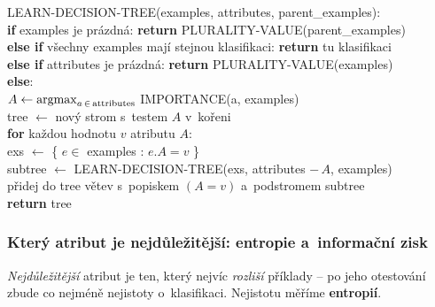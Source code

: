 \begin{algo}
\ttfamily\small
LEARN-DECISION-TREE(examples, attributes, parent\_examples):\\
\hspace*{1.5em}\textbf{if} examples je prázdná: \textbf{return} PLURALITY-VALUE(parent\_examples) \\
\hspace*{1.5em}\textbf{else if} všechny examples mají stejnou klasifikaci: \textbf{return} tu klasifikaci\\
\hspace*{1.5em}\textbf{else if} attributes je prázdná: \textbf{return} PLURALITY-VALUE(examples)\\
\hspace*{1.5em}\textbf{else}:\\
\hspace*{3em}$A \leftarrow \operatorname*{argmax}_{a\,\in\,\text{attributes}}$ IMPORTANCE(a, examples) \\
\hspace*{3em}tree $\leftarrow$ nový strom s~testem $A$ v~kořeni\\
\hspace*{3em}\textbf{for} každou hodnotu $v$ atributu $A$:\\
\hspace*{4.5em}exs $\leftarrow$ \{ $e \in$ examples : $e.A = v$ \}\\
\hspace*{4.5em}subtree $\leftarrow$ LEARN-DECISION-TREE(exs, attributes $-\,A$, examples)\\
\hspace*{4.5em}přidej do tree větev s~popiskem $(A=v)$ a~podstromem subtree\\
\hspace*{3em}\textbf{return} tree
\end{algo}

\subsubsection*{Který atribut je nejdůležitější: entropie a~informační zisk}

\emph{Nejdůležitější} atribut je ten, který nejvíc \emph{rozliší} příklady -- po jeho otestování zbude co nejméně nejistoty o~klasifikaci. Nejistotu měříme \textbf{entropií}.

